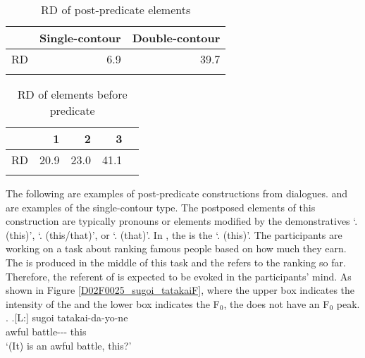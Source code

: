 \begin{table}
 \centering
 \caption{RD of post-predicate elements}
 \begin{tabular}{lrr}
 \lsptoprule
   & Single-contour & Double-contour \\
 \midrule
  RD & 6.9 & 39.7 \\
 \lspbottomrule
 \end{tabular}
 \label{RDPostT}
\end{table}
\begin{table}
  \centering
 \caption{RD of elements before predicate}
 \begin{tabular}{lrrrr}
 \lsptoprule
  &  1  & 2 & 3 \\
 \midrule
 RD & 20.9 & 23.0 & 41.1 \\
 \lspbottomrule
 \end{tabular}
 \label{RDPreT}
\end{table}

The following are examples of post-predicate constructions from dialogues.
\Next and \NNext are examples of the single-contour type.
The postposed elements of this construction are typically pronouns or elements modified by the  demonstratives  `. (this)',  `. (this/that)', or  `. (that)'.
In \Next,
the  is the   `. (this)'.
The participants are working on a task about ranking famous people based on how much they earn.
The  is produced in the middle of this task and
the   refers to the ranking so far.
Therefore, the referent of  is expected to be evoked in the participants' mind.
As shown in Figure \ref{D02F0025_sugoi_tatakaiF},
where the upper box indicates the intensity of the 
and the lower box indicates the F$_{0}$,
the   does not have an F$_{0}$ peak.
%
\ex. \label{D02F0025_sugoi_tatakai}
	\ag.[L:] sugoi tatakai-da-yo-ne  \\
	awful battle--- this \\
	`(It) is an awful battle, this?'

